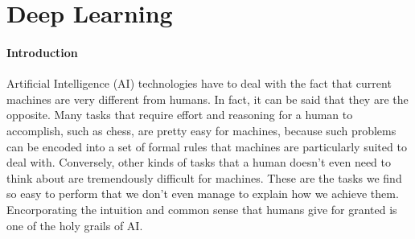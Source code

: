 \documentclass[../main.tex]{subfiles}
\begin{document}
    \section{Deep Learning}\label{sec:deeplearning}

    \paragraph{Introduction}
    Artificial Intelligence (AI) technologies have to deal with the fact that current machines are very different from humans.
    In fact, it can be said that they are the opposite. Many tasks that require effort and reasoning for a human to accomplish,
    such as chess, are pretty easy for machines, because such problems can be encoded into a set of formal rules that machines
    are particularly suited to deal with. Conversely, other kinds of tasks that a human doesn't even need to think about
    are tremendously difficult for machines. These are the tasks we find so easy to perform that we don't even manage to explain how
    we achieve them. Encorporating the intuition and common sense that humans give for granted is one of the holy grails of AI.\@
\end{document}
